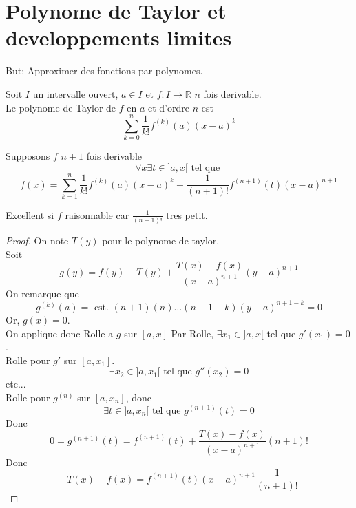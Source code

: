 \documentclass[../main.tex]{subfiles}
\begin{document}
\section{Polynome de Taylor et developpements limites}
But: Approximer des fonctions par polynomes.\\
\begin{defn}
	Soit $I$ un intervalle ouvert, $a\in I$ et $f:I \to \mathbb{R}$ $n$ fois derivable.\\
	Le polynome de Taylor de $f$ en $a$ et d'ordre $n$ est
	\[ 
		\sum_{k=0}^{ n} \frac{1}{k!} f^{( k)} ( a)  ( x-a) ^{k}
	\]
	

\end{defn}
\begin{thm}
Supposons $f$ $n+1$ fois derivable
\[ 
	\forall x \exists t \in ]a,x[ \text{ tel que } 
\]
\[ 
	f( x) = \sum_{k=1}^{ n} \frac{1}{k!}f^{( k) }( a) ( x-a) ^{k} + \frac{1}{( n+1) !} f^{( n+1) }( t)  ( x-a) ^{n+1}
\]


\end{thm}
\begin{rmq}
Excellent si $f$ raisonnable car $\frac{1}{( n+1 )!}$ tres petit.
\end{rmq}
\begin{proof}
	On note $T( y) $ pour le polynome de taylor.\\
	Soit
	\[ 
		g( y) = f( y) - T( y) + \frac{T( x) - f( x) }{( x-a)^{n+1}} ( y-a) ^{n+1}
	\]
	On remarque que
	\[ 
		g^{( k) }( a) = \text{ cst. } ( n+1)( n)\ldots( n+1-k) ( y-a) ^{n+1-k} = 0
	\]
	Or, $g( x) =0$.\\
	On applique donc Rolle a $g$ sur $[a,x]$
	Par Rolle, $\exists x_1 \in ]a,x[$ tel que $g'( x_1) = 0$.\\
	Rolle pour $g'$ sur $[a,x_1]$.\\
	\[ 
		\exists x_2 \in ]a,x_1[ \text{ tel que } g''( x_2) =0
	\]
	etc...\\
	Rolle pour $g^{( n) }$ sur $[a,x_n]$, donc
	\[ 
		\exists t \in ]a,x_n[ \text{ tel que } g^{( n+1) }( t) =0
	\]
Donc
\[ 
	0= g^{( n+1) }( t) = f^{( n+1) }( t) + \frac{T( x) - f( x) }{( x-a) ^{n+1}} ( n+1) !
\]
Donc 
\[ 
	-T( x) + f( x) = f^{( n+1) }( t) ( x-a) ^{n+1} \frac{1}{( n+1) !}
\]

\end{proof}
\end{document}
